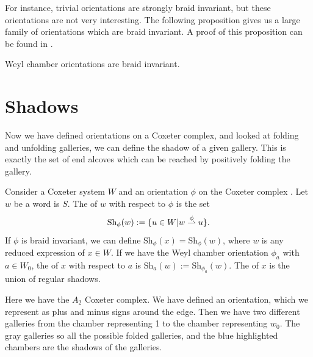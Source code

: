 \documentclass[11pt]{article}
\begin{document}
For instance, trivial orientations are strongly braid invariant, but these orientations are not very interesting. The following proposition gives us a large family of orientations which are braid invariant. A proof of this proposition can be found in \cite[pp.135-138]{SHA}.

\begin{proposition}
    Weyl chamber orientations are braid invariant.
\end{proposition}


\section{Shadows}
Now we have defined orientations on a Coxeter complex, and looked at folding and unfolding galleries, we can define the shadow of a given gallery. This is exactly the set of end alcoves which can be reached by positively folding the gallery. 


\begin{definition}
    Consider a Coxeter system $W$ and an orientation $\phi$ on the Coxeter complex \sg\W. Let $w$ be a word is $S$. The  of $w$ with respect to $\phi$ is the set 
    \[\textnormal{Sh}_\phi(w):=\{u\in W|w\stackrel{\phi}{\rightharpoonup} u\}.\]
    If $\phi$ is braid invariant, we can define Sh$_\phi(x)=$Sh$_\phi(w)$, where $w$ is any reduced expression of $x\in W$. If we have the Weyl chamber orientation $\phi_a$ with $a\in W_0$, the  of $x$ with respect to $a$ is Sh$_a(w):=$Sh$_{\phi_a}(w)$. The  of $x$ is the union of regular shadows. 
\end{definition}

\begin{example}
    Here we have the $A_2$ Coxeter complex. We have defined an orientation, which we represent as plus and minus signs around the edge. Then we have two different galleries from the chamber representing 1 to the chamber representing $w_0$. The gray galleries so all the possible folded galleries, and the blue highlighted chambers are the shadows of the galleries.
\end{example}
\end{document}
